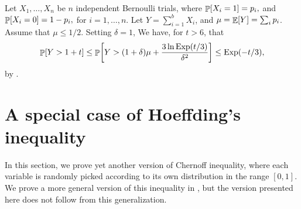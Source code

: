 \begin{example}
    Let $X_1, \ldots, X_n$ be $n$ independent Bernoulli trials, where
    \begin{math}
        \Prob{ X_i = 1 } =p_i,
    \end{math}
    and
    \begin{math}
        \Prob{ X_i = 0 } =1- p_i,
    \end{math}
    for $i=1,\ldots, n$.  Let $Y = \sum_{i=1}^{b} X_i$, and
    $\mu = \mathop{\mathbb{E}}\!\left[ { Y} \right] = \sum_i p_i$. Assume that $\mu \leq 1/2$. Setting
    $\delta=1$, We have, for $t >6$, that
    \begin{equation*}
        \Prob{Y > 1 + t} %
        \leq
        \Prob{Y > (1+\delta)\mu + \frac{3 \ln \Exp( t/3 )}{\delta^2}} %
        \leq%
        \Exp( -t /3 ),
    \end{equation*}
    by .
\end{example}

   
   
   
   \section{A special case of Hoeffding's inequality}
   
   In this section, we prove yet another version of Chernoff
   inequality, where each variable is randomly picked according to its
   own distribution in the range $[0,1]$. We prove a more general
   version of this inequality in , but the version
   presented here does not follow from this generalization.


